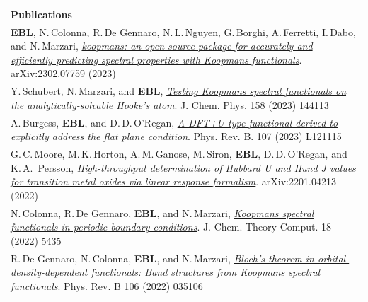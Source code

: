 \documentclass[10pt,a4paper,final]{article}
\begin{document}
\begin{tabularx}{\textwidth}{
   X}
   \rowcolor{seaborn_blue}
      \large\textcolor{seaborn_bg_grey_half}{\textbf{Publications}} \\
   \textbf{EBL}, N.\,Colonna, R.\,De Gennaro, N.\,L.\,Nguyen, G.\,Borghi, A.\,Ferretti, I.\,Dabo, and N.\,Marzari, \href{https://arxiv.org/abs/2302.07759}{\textit{koopmans: an open-source package for accurately and efficiently predicting spectral properties with Koopmans functionals}}. arXiv:2302.07759 (2023)
   \\
   Y.\,Schubert, N.\,Marzari, and \textbf{EBL}, \href{https://doi.org/10.1063/5.0138610}{\textit{Testing Koopmans spectral functionals on the analytically-solvable Hooke's atom}}. J. Chem. Phys. 158 (2023) 144113
   \\
   A.\,Burgess, \textbf{EBL}, and D.\,D.\,O'Regan, \href{https://doi.org/10.1103/PhysRevB.107.L121115}{\textit{A DFT+U type functional derived to explicitly address the flat plane condition}}. Phys. Rev. B. 107 (2023) L121115
   \\
   G.\,C.\,Moore, M.\,K.\,Horton, A.\,M.\,Ganose, M.\,Siron, \textbf{EBL}, D.\,D.\,O'Regan, and K.\,A.\, Persson, \href{https://arxiv.org/abs/2201.04213}{\textit{High-throughput determination of Hubbard U and Hund J values for transition metal oxides via linear response formalism}}. arXiv:2201.04213 (2022) \\
   N.\,Colonna, R.\,De Gennaro, \textbf{EBL}, and N.\,Marzari, \href{https://pubs.acs.org/doi/10.1021/acs.jctc.2c00161}{\textit{Koopmans spectral functionals in periodic-boundary conditions}}. J. Chem. Theory Comput. 18 (2022) 5435                                                                                                                                                                                                                                                                                                                                                                                                                                                                                                                                                                \\ %
   R.\,De Gennaro, N.\,Colonna, \textbf{EBL}, and N.\,Marzari, \href{https://doi.org/10.1103/PhysRevB.106.035106}{\textit{Bloch's theorem in orbital-density-dependent functionals: Band structures from Koopmans spectral functionals}}. Phys. Rev. B 106 (2022) 035106                                                                                                                                                                                                                                                                                                                                                                                                                                                                                                     \\ %

\end{tabularx}
\end{document}
